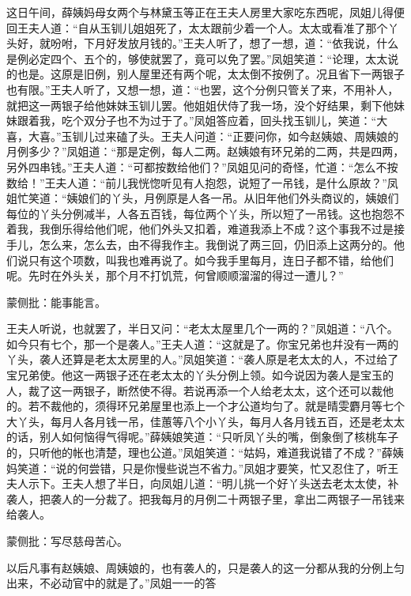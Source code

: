 \begin{parag}
    这日午间，薛姨妈母女两个与林黛玉等正在王夫人房里大家吃东西呢，凤姐儿得便回王夫人道：“自从玉钏儿姐姐死了，太太跟前少着一个人。太太或看准了那个丫头好，就吩咐，下月好发放月钱的。”王夫人听了，想了一想，道：“依我说，什么是例必定四个、五个的，够使就罢了，竟可以免了罢。”凤姐笑道：“论理，太太说的也是。这原是旧例，别人屋里还有两个呢，太太倒不按例了。况且省下一两银子也有限。”王夫人听了，又想一想，道：“也罢，这个分例只管关了来，不用补人，就把这一两银子给他妹妹玉钏儿罢。他姐姐伏侍了我一场，没个好结果，剩下他妹妹跟着我，吃个双分子也不为过于了。”凤姐答应着，回头找玉钏儿，笑道：“大喜，大喜。”玉钏儿过来磕了头。王夫人问道：“正要问你，如今赵姨娘、周姨娘的月例多少？”凤姐道：“那是定例，每人二两。赵姨娘有环兄弟的二两，共是四两，另外四串钱。”王夫人道：“可都按数给他们？”凤姐见问的奇怪，忙道：“怎么不按数给！”王夫人道：“前儿我恍惚听见有人抱怨，说短了一吊钱，是什么原故？”凤姐忙笑道：“姨娘们的丫头，月例原是人各一吊。从旧年他们外头商议的，姨娘们每位的丫头分例减半，人各五百钱，每位两个丫头，所以短了一吊钱。这也抱怨不着我，我倒乐得给他们呢，他们外头又扣着，难道我添上不成？这个事我不过是接手儿，怎么来，怎么去，由不得我作主。我倒说了两三回，仍旧添上这两分的。他们说只有这个项数，叫我也难再说了。如今我手里每月，连日子都不错，给他们呢。先时在外头关，那个月不打饥荒，何曾顺顺溜溜的得过一遭儿？”\begin{note}蒙侧批：能事能言。\end{note}王夫人听说，也就罢了，半日又问：“老太太屋里几个一两的？”凤姐道：“八个。如今只有七个，那一个是袭人。”王夫人道：“这就是了。你宝兄弟也幷没有一两的丫头，袭人还算是老太太房里的人。”凤姐笑道：“袭人原是老太太的人，不过给了宝兄弟使。他这一两银子还在老太太的丫头分例上领。如今说因为袭人是宝玉的人，裁了这一两银子，断然使不得。若说再添一个人给老太太，这个还可以裁他的。若不裁他的，须得环兄弟屋里也添上一个才公道均匀了。就是晴雯麝月等七个大丫头，每月人各月钱一吊，佳蕙等八个小丫头，每月人各月钱五百，还是老太太的话，别人如何恼得气得呢。”薛姨娘笑道：“只听凤丫头的嘴，倒象倒了核桃车子的，只听他的帐也清楚，理也公道。”凤姐笑道：“姑妈，难道我说错了不成？”薛姨妈笑道：“说的何尝错，只是你慢些说岂不省力。”凤姐才要笑，忙又忍住了，听王夫人示下。王夫人想了半日，向凤姐儿道：“明儿挑一个好丫头送去老太太使，补袭人，把袭人的一分裁了。把我每月的月例二十两银子里，拿出二两银子一吊钱来给袭人。\begin{note}蒙侧批：写尽慈母苦心。\end{note}以后凡事有赵姨娘、周姨娘的，也有袭人的，只是袭人的这一分都从我的分例上匀出来，不必动官中的就是了。”凤姐一一的答
\end{parag}

